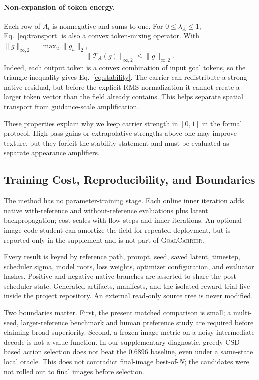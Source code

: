 \documentclass[10pt,letterpaper]{article}
\newcommand{\method}{\textsc{GoalCarrier}}
\begin{document}
\paragraph{Non-expansion of token energy.}
Each row of $A_t$ is nonnegative and sums to one. For
$0\leq\lambda_A\leq1$, Eq.~\ref{eq:transport} is also a convex token-mixing
operator. With $\lVert g\rVert_{\infty,2}=\max_u\lVert g_u\rVert_2$,
\begin{equation}
 \lVert\mathcal T_A(g)\rVert_{\infty,2}
 \leq \lVert g\rVert_{\infty,2}.
 \label{eq:stability}
\end{equation}
Indeed, each output token is a convex combination of input goal tokens, so the
triangle inequality gives Eq.~\ref{eq:stability}. The carrier can redistribute
a strong native residual, but before the explicit RMS normalization it cannot
create a larger token vector than the field already contains. This helps
separate spatial transport from guidance-scale amplification.

These properties explain why we keep carrier strength in $[0,1]$ in the formal
protocol. High-pass gains or extrapolative strengths above one may improve
texture, but they forfeit the stability statement and must be evaluated as
separate appearance amplifiers.

\subsection{Training Cost, Reproducibility, and Boundaries}

The method has no parameter-training stage. Each online inner iteration adds
native with-reference and without-reference evaluations plus latent
backpropagation; cost scales with flow steps and inner iterations. An optional
image-code student can amortize the field for repeated deployment, but is
reported only in the supplement and is not part of \method.

Every result is keyed by reference path, prompt, seed, saved latent, timestep,
scheduler sigma, model roots, loss weights, optimizer configuration, and
evaluator hashes. Positive and negative native branches are asserted to share
the post-scheduler state. Generated artifacts, manifests, and the isolated
reward trial live inside the project repository. An external read-only source
tree is never modified.

Two boundaries matter. First, the present matched comparison is small; a
multi-seed, larger-reference benchmark and human preference study are required
before claiming broad superiority. Second, a frozen image metric on a noisy
intermediate decode is not a value function. In our supplementary diagnostic,
greedy CSD-based action selection does not beat the 0.6896 baseline, even under
a same-state local oracle. This does not contradict final-image best-of-$N$;
the candidates were not rolled out to final images before selection.
\end{document}
